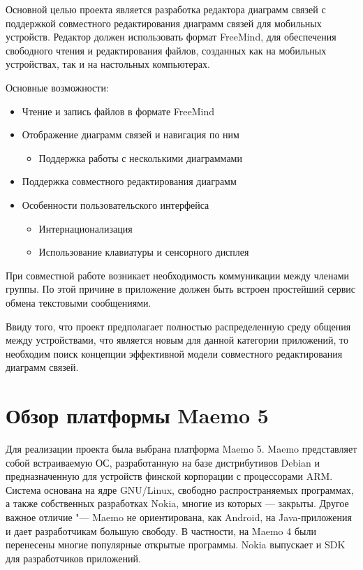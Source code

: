 Основной целью проекта является разработка редактора диаграмм связей с поддержкой совместного редактирования диаграмм связей для мобильных устройств. Редактор должен использовать формат FreeMind, для обеспечения свободного чтения и редактирования файлов, созданных как на мобильных устройствах, так и на настольных компьютерах.

Основные возможности:
\begin{itemize}
\item Чтение и запись файлов в формате FreeMind
\item Отображение диаграмм связей и навигация по ним
\begin{itemize}
\item Поддержка работы с несколькими диаграммами
\end{itemize}
\item Поддержка совместного редактирования диаграмм
\item Особенности пользовательского интерфейса
\begin{itemize}
\item Интернационализация
\item Использование клавиатуры и сенсорного дисплея
\end{itemize}
\end{itemize}

При совместной работе возникает необходимость коммуникации между членами группы. По этой причине в приложение должен быть встроен простейший сервис обмена текстовыми сообщениями.

Ввиду того, что проект предполагает полностью распределенную среду общения между устройствами, что является новым для данной категории приложений, то необходим поиск концепции эффективной модели совместного редактирования диаграмм связей.

\section{Обзор платформы Maemo 5}\label{sec:compare_platforms}

Для реализации проекта была выбрана платформа Maemo 5.
Maemo представляет собой встраиваемую ОС, разработанную на базе дистрибутивов Debian и предназначенную для устройств финской корпорации с процессорами ARM. Система основана на ядре GNU/Linux, свободно распространяемых программах, а также собственных разработках Nokia, многие из которых — закрыты. Другое важное отличие "--- Maemo не ориентирована, как Android, на Java-приложения и дает разработчикам большую свободу. В частности, на Maemo 4 были перенесены многие популярные открытые программы. Nokia выпускает и SDK для разработчиков приложений.

